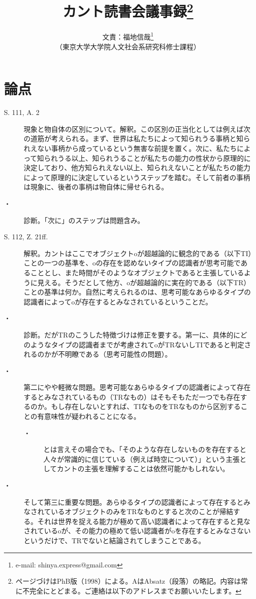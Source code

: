 \documentclass[a4j, 12pt,leqno]{jsarticle}
\title{カント読書会議事録\thanks{ページづけはPhB版（1998）による。AはAbsatz（段落）の略記。内容は常に不完全にとどまる。ご連絡は以下のアドレスまでお願いいたします。}}
\author{文責：福地信哉\thanks{e-mail: shinya.express@gmail.com}\\ （東京大学大学院人文社会系研究科修士課程）}
\begin{document}
\maketitle


\section*{論点}
\begin{description}
\item[S. 111, A. 2]現象と物自体の区別について。解釈。この区別の正当化としては例えば次の道筋が考えられる。まず、世界は私たちによって知られうる事柄と知られえない事柄から成っているという無害な前提を置く。次に、私たちによって知られうる以上、知られうることが私たちの能力の性状から原理的に決定しており、他方知られえない以上、知られえないことが私たちの能力によって原理的に決定しているというステップを踏む。そして前者の事柄は現象に、後者の事柄は物自体に帰せられる。
\begin{prooftree}
\end{prooftree}
\item[・]診断。「次に」のステップは問題含み。

\end{description}
\begin{description}
\item[S. 112, Z. 21ff.]解釈。カントはここでオブジェクトoが超越論的に観念的である（以下TI）ことの一つの基準を、oの存在を認めないタイプの認識者が思考可能であることとし、また時間がそのようなオブジェクトであると主張しているように見える。そうだとして他方、oが超越論的に実在的である（以下TR）ことの基準は何か。自然に考えられるのは、思考可能なあらゆるタイプの認識者によってoが存在するとみなされているということだ。
\item[・]診断。だがTRのこうした特徴づけは修正を要する。第一に、具体的にどのようなタイプの認識者までが考慮されてoがTRないしTIであると判定されるのかが不明瞭である（思考可能性の問題）。
\item[・]第二にやや軽微な問題。思考可能なあらゆるタイプの認識者によって存在するとみなされているもの（TRなもの）はそもそもただ一つでも存在するのか。もし存在しないとすれば、TIなものをTRなものから区別することの有意味性が疑われることになる。
\begin{description}
\item[・]とは言えその場合でも、「そのような存在しないものを存在すると人々が常識的に信じている（例えば時空について）」という主張としてカントの主張を理解することは依然可能かもしれない。
\end{description}
\item[・]そして第三に重要な問題。あらゆるタイプの認識者によって存在するとみなされているオブジェクトのみをTRなものとすると次のことが帰結する。それは世界を捉える能力が極めて高い認識者によって存在すると見なされているoが、その能力の極めて低い認識者がoを存在するとみなさないというだけで、TRでないと結論されてしまうことである。
\end{description}
\end{document}
